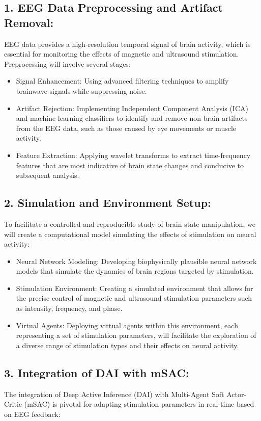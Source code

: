 \documentclass{article}
\begin{document}
\subsection*{1. EEG Data Preprocessing and Artifact Removal:}
EEG data provides a high-resolution temporal signal of brain activity, which is essential for monitoring the effects of magnetic and ultrasound stimulation. Preprocessing will involve several stages:

\begin{itemize}
    \item Signal Enhancement: Using advanced filtering techniques to amplify brainwave signals while suppressing noise.
    \item Artifact Rejection: Implementing Independent Component Analysis (ICA) and machine learning classifiers to identify and remove non-brain artifacts from the EEG data, such as those caused by eye movements or muscle activity.
    \item Feature Extraction: Applying wavelet transforms to extract time-frequency features that are most indicative of brain state changes and conducive to subsequent analysis.
\end{itemize}

\subsection*{2. Simulation and Environment Setup:}
To facilitate a controlled and reproducible study of brain state manipulation, we will create a computational model simulating the effects of stimulation on neural activity:

\begin{itemize}
    \item Neural Network Modeling: Developing biophysically plausible neural network models that simulate the dynamics of brain regions targeted by stimulation.
    \item Stimulation Environment: Creating a simulated environment that allows for the precise control of magnetic and ultrasound stimulation parameters such as intensity, frequency, and phase.
    \item Virtual Agents: Deploying virtual agents within this environment, each representing a set of stimulation parameters, will facilitate the exploration of a diverse range of stimulation types and their effects on neural activity.
\end{itemize}

\subsection*{3. Integration of DAI with mSAC:}
The integration of Deep Active Inference (DAI) with Multi-Agent Soft Actor-Critic (mSAC) is pivotal for adapting stimulation parameters in real-time based on EEG feedback:
\end{document}
